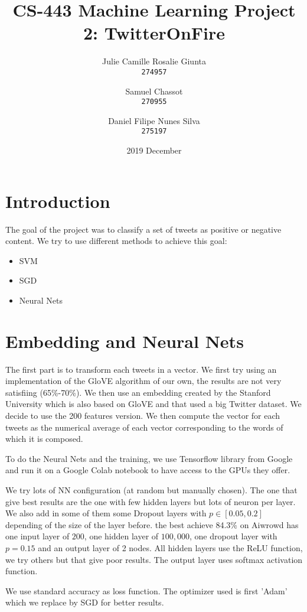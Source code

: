 \documentclass[11pt, a4paper, twocolumn]{article}
\begin{document}
\date{2019 December}
\title{CS-443 Machine Learning Project 2: TwitterOnFire}
\author{
  Julie Camille Rosalie Giunta\\
  \texttt{274957}
  \and
  Samuel Chassot\\
  \texttt{270955}
  \and
  Daniel Filipe Nunes Silva\\
  \texttt{275197}
}

\maketitle
\clearpage

\section{Introduction}
The goal of the project was to classify a set of tweets as positive or negative content. We try to use different methods to achieve this goal:

\begin{itemize}
  \item SVM
  \item SGD
  \item Neural Nets
\end{itemize}

\section{Embedding and Neural Nets}
The first part is to transform each tweets in a vector. We first try using an implementation of the GloVE algorithm of our own, the results are not very satisfiing (65\%-70\%). We then use an embedding created by the Stanford University which is also based on GloVE and that used a big Twitter dataset. We decide to use the 200 features version.
We then compute the vector for each tweets as the numerical average of each vector corresponding to the words of which it is composed.

To do the Neural Nets and the training, we use Tensorflow library from Google and run it on a Google Colab notebook to have access to the GPUs they offer.

We try lots of NN configuration (at random but manually chosen). The one that give best results are the one with few hidden layers but lots of neuron per layer. We also add in some of them some Dropout layers with $p\in [0.05, 0.2]$ depending of the size of the layer before.
the best achieve 84.3\% on Aiwrowd has one input layer of $200$, one hidden layer of $100,000$, one dropout layer with $p=0.15$ and an output layer of 2 nodes. All hidden layers use the ReLU function, we try others but that give poor results. The output layer uses softmax activation function.

We use standard accuracy as loss function. The optimizer used is first 'Adam' which we replace by SGD for better results.
\end{document}

